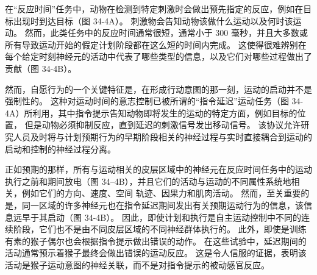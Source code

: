 在“反应时间”任务中，动物在检测到特定刺激时会做出预先指定的反应，例如在目标出现时到达目标（图 34-4A）。 刺激物会告知动物该做什么运动以及何时该运动。 然而，此类任务中的反应时间通常很短，通常小于 300 毫秒，并且大多数或所有导致运动开始的假定计划阶段都在这么短的时间内完成。 这使得很难辨别在每个给定时刻神经元的活动中代表了哪些类型的信息，以及它们对哪些过程做出了贡献（图 34-4B）。

然而，自愿行为的一个关键特征是，在形成行动意图的那一刻，运动的启动并不是强制性的。 这种对运动时间的意志控制已被所谓的“指令延迟”运动任务（图 34-4A）所利用，其中指令提示告知动物即将发生的运动的特定方面，例如目标的位置， 但是动物必须抑制反应，直到延迟的刺激信号发出移动信号。 该协议允许研究人员及时将与计划预期行为的早期阶段相关的神经过程与实时直接耦合到运动的启动和控制的神经过程分离。

正如预期的那样，所有与运动相关的皮层区域中的神经元在反应时间任务中的运动执行之前和期间放电（图 34–4B），并且它们的活动与运动的不同属性系统地相关，例如它们的方向、速度、空间 轨迹、因果力和肌肉活动。 然而，至关重要的是，同一区域的许多神经元也在指令延迟期间发出有关预期运动行为的信息，该信息远早于其启动（图 34-4B）。 因此，即使计划和执行是自主运动控制中不同的连续阶段，它们也不是由不同皮层区域的不同神经群体执行的。 此外，即使是训练有素的猴子偶尔也会根据指令提示做出错误的动作。 在这些试验中，延迟期间的活动通常预示着猴子最终会做出错误的运动反应。 这是令人信服的证据，表明该活动是猴子运动意图的神经关联，而不是对指令提示的被动感官反应。

